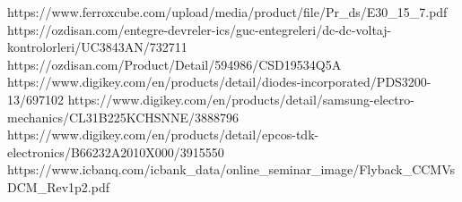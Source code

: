 \documentclass[12pt]{article}
\begin{document}
\begin{thebibliography}{00}
    https://www.ferroxcube.com/upload/media/product/file/Pr\_ds/E30\_15\_7.pdf
     https://ozdisan.com/entegre-devreler-ics/guc-entegreleri/dc-dc-voltaj-kontrolorleri/UC3843AN/732711
     https://ozdisan.com/Product/Detail/594986/CSD19534Q5A
     https://www.digikey.com/en/products/detail/diodes-incorporated/PDS3200-13/697102 
     https://www.digikey.com/en/products/detail/samsung-electro-mechanics/CL31B225KCHSNNE/3888796
     https://www.digikey.com/en/products/detail/epcos-tdk-electronics/B66232A2010X000/3915550
     https://www.icbanq.com/icbank\_data/online\_seminar\_image/Flyback\_CCMVsDCM\_Rev1p2.pdf
    
\end{thebibliography}
\end{document}
